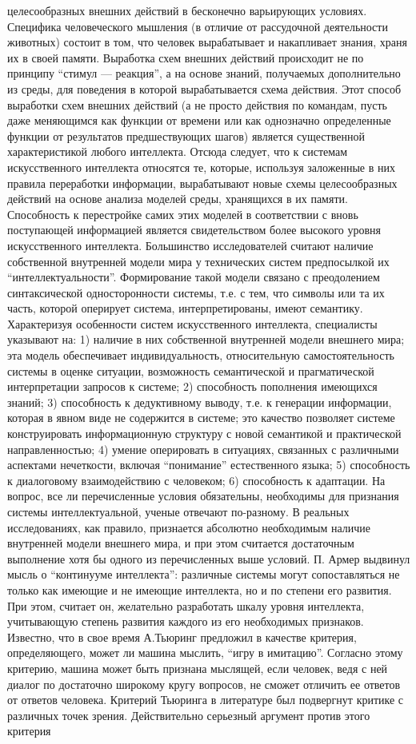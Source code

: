 целесообразных внешних действий в бесконечно варьирующих условиях. Специфика человеческого мышления (в отличие от рассудочной деятельности животных) состоит в том, что человек вырабатывает и накапливает знания, храня их в своей памяти. Выработка схем внешних действий происходит не по принципу ``стимул --- реакция'', а на основе знаний, получаемых дополнительно из среды, для поведения в которой вырабатывается схема действия. Этот способ выработки схем внешних действий (а не просто действия по командам, пусть даже меняющимся как функции от времени или как однозначно определенные функции от результатов предшествующих шагов) является существенной характеристикой любого интеллекта. Отсюда следует, что к системам искусственного интеллекта относятся те, которые, используя заложенные в них правила переработки информации, вырабатывают новые схемы целесообразных действий на основе анализа моделей среды, хранящихся в их памяти. Способность к перестройке самих этих моделей в соответствии с вновь поступающей информацией является свидетельством более высокого уровня искусственного интеллекта. Большинство исследователей считают наличие собственной внутренней модели мира у технических систем предпосылкой их ``интеллектуальности''. Формирование такой модели связано с преодолением синтаксической односторонности системы, т.е. с тем, что символы или та их часть, которой оперирует система, интерпретированы, имеют семантику. Характеризуя особенности систем искусственного интеллекта, специалисты указывают на: 1) наличие в них собственной внутренней модели внешнего мира; эта модель обеспечивает индивидуальность, относительную самостоятельность системы в оценке ситуации, возможность семантической и прагматической интерпретации запросов к системе; 2) способность пополнения имеющихся знаний; 3) способность к дедуктивному выводу, т.е. к генерации информации, которая в явном виде не содержится в системе; это качество позволяет системе конструировать информационную структуру с новой семантикой и практической направленностью; 4) умение оперировать в ситуациях, связанных с различными аспектами нечеткости, включая ``понимание'' естественного языка; 5) способность к диалоговому взаимодействию с человеком; 6) способность к адаптации. На вопрос, все ли перечисленные условия обязательны, необходимы для признания системы интеллектуальной, ученые отвечают по-разному. В реальных исследованиях, как правило, признается абсолютно необходимым наличие внутренней модели внешнего мира, и при этом считается достаточным выполнение хотя бы одного из перечисленных выше условий. П. Армер выдвинул мысль о ``континууме интеллекта'': различные системы могут сопоставляться не только как имеющие и не имеющие интеллекта, но и по степени его развития. При этом, считает он, желательно разработать шкалу уровня интеллекта, учитывающую степень развития каждого из его необходимых признаков. Известно, что в свое время А.Тьюринг предложил в качестве критерия, определяющего, может ли машина мыслить, ``игру в имитацию''. Согласно этому критерию, машина может быть признана мыслящей, если человек, ведя с ней диалог по достаточно широкому кругу вопросов, не сможет отличить ее ответов от ответов человека. Критерий Тьюринга в литературе был подвергнут критике с различных точек зрения. Действительно серьезный аргумент против этого критерия 